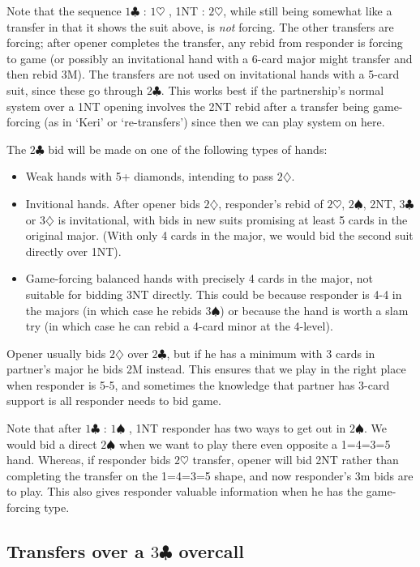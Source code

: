 \documentclass{article}
\newcommand{\sz}{\spadesuit}
\newcommand{\hz}{\heartsuit}
\newcommand{\dz}{\diamondsuit}
\newcommand{\cz}{\clubsuit}
\begin{document}
\vspace{3mm}
Note that the sequence $1\cz$ : $1\hz$ , 1NT : $2\hz$, while still being somewhat like a transfer in that it shows the suit above, is \emph{not} forcing. The other transfers are forcing; after opener completes the transfer, any rebid from responder is forcing to game (or possibly an invitational hand with a 6-card major might transfer and then rebid 3M). The transfers are not used on invitational hands with a 5-card suit, since these go through $2\cz$. This works best if the partnership's normal system over a 1NT opening involves the 2NT rebid after a transfer being game-forcing (as in `Keri' or `re-transfers') since then we can play system on here.

The $2\cz$ bid will be made on one of the following types of hands:
\begin{itemize}
\item Weak hands with 5+ diamonds, intending to pass $2\dz$.
\item Invitional hands. After opener bids $2\dz$, responder's rebid of $2\hz$, $2\sz$, 2NT, $3\cz$ or $3\dz$ is invitational, with bids in new suits promising at least 5 cards in the original major. (With only 4 cards in the major, we would bid the second suit directly over 1NT).
\item Game-forcing balanced hands with precisely 4 cards in the major, not suitable for bidding 3NT directly. This could be because responder is 4-4 in the majors (in which case he rebids $3\sz$) or because the hand is worth a slam try (in which case he can rebid a 4-card minor at the 4-level).
\end{itemize}
Opener usually bids $2\dz$ over $2\cz$, but if he has a minimum with 3 cards in partner's major he bids 2M instead. This ensures that we play in the right place when responder is 5-5, and sometimes the knowledge that partner has 3-card support is all responder needs to bid game.

Note that after $1\cz$ : $1\sz$ , 1NT responder has two ways to get out in $2\sz$. We would bid a direct $2\sz$ when we want to play there even opposite a 1=4=3=5 hand. Whereas, if responder bids $2\hz$ transfer, opener will bid 2NT rather than completing the transfer on the 1=4=3=5 shape, and now responder's 3m bids are to play. This also gives responder valuable information when he has the game-forcing type.

\subsection{Transfers over a $3\cz$ overcall}
\end{document}
